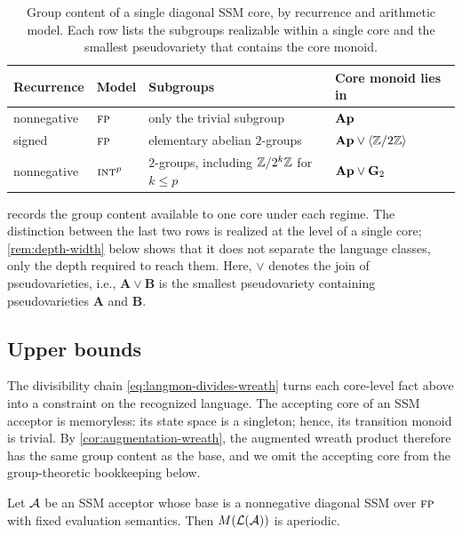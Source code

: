 \documentclass{article}
\begin{document}
\begin{table}[ht]
\caption{Group content of a single diagonal SSM core, by recurrence and arithmetic model. Each row lists the subgroups realizable within a single core and the smallest pseudovariety that contains the core monoid.}
\centering
\begin{tabular}{l l | l | l}
\hline
Recurrence & Model & Subgroups & Core monoid lies in \\ \hline
nonnegative & $\textsc{fp}$ & only the trivial subgroup & $\mathbf{Ap}$ \\
signed & $\textsc{fp}$ & elementary abelian $2$-groups & $\mathbf{Ap} \vee \langle\mathbb{Z}/{2}\mathbb{Z}\rangle$\\
nonnegative & $\textsc{int}^p$ & $2$-groups, including $\mathbb{Z}/{2^k}\mathbb{Z}$ for $k\le p$ & $\mathbf{Ap} \vee \mathbf{G}_2$\\
\hline
\end{tabular}
\label{tab:ssm-arithmetic-semi}
\end{table}


 records the group content available to one core under each regime. 
The distinction between the last two rows is realized at the level of a single core; \cref{rem:depth-width} below shows that it does not separate the language classes, only the depth required to reach them. 
Here, $\vee$ denotes the join of pseudovarieties, i.e., $\mathbf{A} \vee \mathbf{B}$ is the smallest pseudovariety containing pseudovarieties $\mathbf{A}$ and $\mathbf{B}$.


\subsection{Upper bounds}\label{sec:ssm-upper}
The divisibility chain \cref{eq:langmon-divides-wreath} turns each core-level fact above into a constraint on the recognized language.
The accepting core of an SSM acceptor is memoryless: its state space is a singleton; hence, its transition monoid is trivial.
By \cref{cor:augmentation-wreath}, the augmented wreath product therefore has the same group content as the base, and we omit the accepting core from the group-theoretic bookkeeping below.

\begin{theorem}\label{thm:nonnegative-fp}
Let $\mathcal{A}$ be an SSM acceptor whose base is a nonnegative diagonal SSM over $\textsc{fp}$ with fixed evaluation semantics.
Then $M(\mathcal{L}(\mathcal{A}))$ is aperiodic.
\end{theorem}
\end{document}
